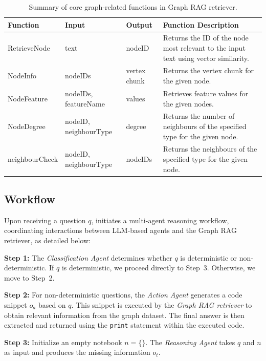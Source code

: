 \begin{table}[ht]
\centering
\small
\begin{tabular}{|l|l|l|l|}
\hline
\textbf{Function} & \textbf{Input} & \textbf{Output} & \textbf{Function Description} \\
\hline
RetrieveNode & text & nodeID & Returns the ID of the node most relevant to the input text using vector similarity. \\
\hline
NodeInfo & nodeIDs & vertex chunk & Returns the vertex chunk for the given node. \\
\hline
NodeFeature & nodeIDs, featureName & values & Retrieves feature values for the given nodes. \\
\hline
NodeDegree & nodeID, neighbourType & degree & Returns the number of neighbours of the specified type for the given node. \\
\hline
neighbourCheck & nodeID, neighbourType & nodeIDs & Returns the neighbours of the specified type for the given node. \\
\hline
\end{tabular}
\caption{Summary of core graph-related functions in Graph RAG retriever.}
\label{tab:function_summary}
\end{table}


\subsection{Workflow}
Upon receiving a question $q$, \projectname initiates a multi-agent reasoning workflow, coordinating interactions between LLM-based agents and the Graph RAG retriever, as detailed below:

\noindent \textbf{Step 1:} The \textit{Classification Agent} determines whether $q$ is deterministic or non-deterministic. If $q$ is deterministic, we proceed directly to Step~3. Otherwise, we move to Step~2.

\noindent \textbf{Step 2:} For non-deterministic questions, the \textit{Action Agent} generates a code snippet $o_a$ based on $q$. This snippet is executed by the \textit{Graph RAG retriever} to obtain relevant information from the graph dataset. The final answer is then extracted and returned using the \texttt{print} statement within the executed code.

\noindent \textbf{Step 3:} Initialize an empty notebook $n = \{\}$. The \textit{Reasoning Agent} takes $q$ and $n$ as input and produces the missing information $o_t$.

